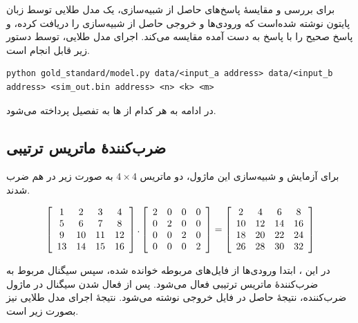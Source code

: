 \documentclass[conference]{IEEEtran-ModifiedForMVIP}
\begin{document}
برای بررسی و مقایسهٔ پاسخ‌های حاصل از شبیه‌سازی، یک مدل طلایی توسط زبان پایتون نوشته شده‌است
که ورودی‌ها و خروجی حاصل از شبیه‌سازی را دریافت کرده، و پاسخ صحیح را با پاسخ به دست آمده مقایسه می‌کند.
اجرای مدل طلایی، توسط دستور زیر قابل انجام است.

\begin{latin}
\begin{lstlisting}
python gold_standard/model.py data/<input_a address> data/<input_b address> <sim_out.bin address> <n> <k> <m>
\end{lstlisting}
\end{latin}

در ادامه به هر کدام از
ها
به تفصیل پرداخته می‌شود.

\subsection{
    ضرب‌کنندهٔ ماتریس ترتیبی
}

برای آزمایش و شبیه‌سازی این ماژول، دو ماتریس
$4 \times 4$
به صورت زیر در هم ضرب شدند.

\tiny
\begin{align}
    \left[
        \begin{array}{c c c c}
            1&2&3&4\\
            5&6&7&8\\
            9&10&11&12\\
            13&14&15&16
        \end{array}
    \right] . \left[
        \begin{array}{c c c c}
            2&0&0&0\\
            0&2&0&0\\
            0&0&2&0\\
            0&0&0&2
        \end{array}
    \right]
    = \left[
        \begin{array}{c c c c}
            2&4&6&8\\
            10&12&14&16\\
            18&20&22&24\\
            26&28&30&32
        \end{array}
    \right]
    \label{eq:SquareMatrix}
\end{align}
\normalsize

در این
،
ابتدا ورودی‌ها از فایل‌های مربوطه خوانده شده، سپس سیگنال
مربوط به ضرب‌کنندهٔ ماتریس ترتیبی فعال می‌شود. پس از فعال شدن سیگنال
در ماژول ضرب‌کننده، نتیجهٔ حاصل در فایل خروجی نوشته می‌شود.
نتیجهٔ اجرای مدل طلایی نیز بصورت زیر است.
\end{document}
